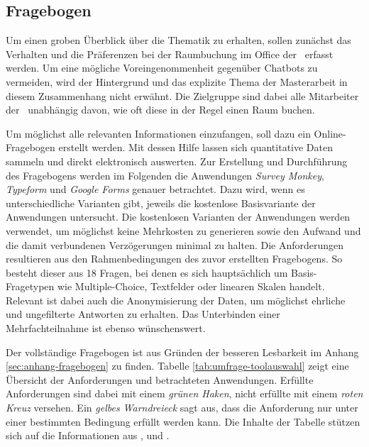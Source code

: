 \subsection{Fragebogen}
\label{subsec:fragebogen}

Um einen groben Überblick über die Thematik zu erhalten, sollen zunächst das Verhalten und die Präferenzen bei der Raumbuchung im Office der \adorsys\ erfasst werden. Um eine mögliche Voreingenommenheit gegenüber Chatbots zu vermeiden, wird der Hintergrund und das explizite Thema der Masterarbeit in diesem Zusammenhang nicht erwähnt. Die Zielgruppe sind dabei alle Mitarbeiter der \adorsys\ unabhängig davon, wie oft diese in der Regel einen Raum buchen. 

Um möglichst alle relevanten Informationen einzufangen, soll dazu ein Online-Frage\-bogen erstellt werden. Mit dessen Hilfe lassen sich quantitative Daten sammeln und direkt elektronisch auswerten. Zur Erstellung und Durchführung des Fragebogens werden im Folgenden die Anwendungen \textit{Survey Monkey}, \textit{Typeform} und \textit{Google Forms} genauer betrachtet. Dazu wird, wenn es unterschiedliche Varianten gibt, jeweils die kostenlose Basisvariante der Anwendungen untersucht. Die kostenlosen Varianten der Anwendungen werden verwendet, um möglichst keine Mehrkosten zu generieren sowie den Aufwand und die damit verbundenen Verzögerungen minimal zu halten. Die Anforderungen resultieren aus den Rahmenbedingungen des zuvor erstellten Fragebogens. So besteht dieser aus 18 Fragen, bei denen es sich hauptsächlich um Basis-Fragetypen wie Multiple-Choice, Textfelder oder linearen Skalen handelt. Relevant ist dabei auch die Anonymisierung der Daten, um möglichst ehrliche und ungefilterte Antworten zu erhalten. Das Unterbinden einer Mehrfachteilnahme ist ebenso wünschenswert. 

Der vollständige Fragebogen ist aus Gründen der besseren Lesbarkeit im Anhang \ref{sec:anhang-fragebogen} zu finden. 
Tabelle \ref{tab:umfrage-toolauswahl} zeigt eine Übersicht der Anforderungen und betrachteten Anwendungen. Erfüllte Anforderungen sind dabei mit einem \textit{grünen Haken}, nicht erfüllte mit einem \textit{roten Kreuz} versehen. Ein \textit{gelbes Warndreieck} sagt aus, dass die Anforderung nur unter einer bestimmten Bedingung erfüllt werden kann. Die Inhalte der Tabelle stützen sich auf die Informationen aus \cite{surveymonkey_surveymonkey_2018}, \cite{typeform_plans_2018} und \cite{google_forms_google_2018}.
\newline

